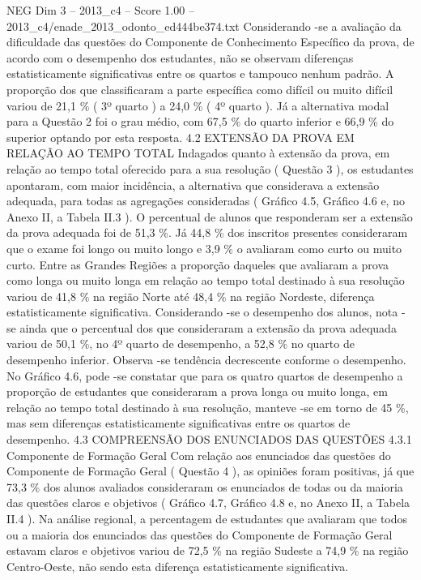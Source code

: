 \begin{textsample}{NEG Dim 3 – 2013\_c4 – Score 1.00 – 2013\_c4/enade\_2013\_odonto\_ed444be374.txt}
Considerando -se a avaliação da dificuldade das questões do Componente de Conhecimento Específico da prova, de acordo com o desempenho dos estudantes, não se observam diferenças estatisticamente significativas entre os quartos e tampouco nenhum padrão.
A proporção dos que classificaram a parte específica como difícil ou muito difícil variou de 21,1 \% ( 3º quarto ) a 24,0 \% ( 4º quarto ).
Já a alternativa modal para a Questão 2 foi o grau médio, com 67,5 \% do quarto inferior e 66,9 \% do superior optando por esta resposta. 4.2 EXTENSÃO DA PROVA EM RELAÇÃO AO TEMPO TOTAL Indagados quanto à extensão da prova, em relação ao tempo total oferecido para a sua resolução ( Questão 3 ), os estudantes apontaram, com maior incidência, a alternativa que considerava a extensão adequada, para todas as agregações consideradas ( Gráfico 4.5, Gráfico 4.6 e, no Anexo II, a Tabela II.3 ).
O percentual de alunos que responderam ser a extensão da prova adequada foi de 51,3 \%.
Já 44,8 \% dos inscritos presentes consideraram que o exame foi longo ou muito longo e 3,9 \% o avaliaram como curto ou muito curto.
Entre as Grandes Regiões a proporção daqueles que avaliaram a prova como longa ou muito longa em relação ao tempo total destinado à sua resolução variou de 41,8 \% na região Norte até 48,4 \% na região Nordeste, diferença estatisticamente significativa.
Considerando -se o desempenho dos alunos, nota -se ainda que o percentual dos que consideraram a extensão da prova adequada variou de 50,1 \%, no 4º quarto de desempenho, a 52,8 \% no quarto de desempenho inferior.
Observa -se tendência decrescente conforme o desempenho.
No Gráfico 4.6, pode -se constatar que para os quatro quartos de desempenho a proporção de estudantes que consideraram a prova longa ou muito longa, em relação ao tempo total destinado à sua resolução, manteve -se em torno de 45 \%, mas sem diferenças estatisticamente significativas entre os quartos de desempenho. 4.3 COMPREENSÃO DOS ENUNCIADOS DAS QUESTÕES 4.3.1 Componente de Formação Geral Com relação aos enunciados das questões do Componente de Formação Geral ( Questão 4 ), as opiniões foram positivas, já que 73,3 \% dos alunos avaliados consideraram os enunciados de todas ou da maioria das questões claros e objetivos ( Gráfico 4.7, Gráfico 4.8 e, no Anexo II, a Tabela II.4 ).
Na análise regional, a percentagem de estudantes que avaliaram que todos ou a maioria dos enunciados das questões do Componente de Formação Geral estavam claros e objetivos variou de 72,5 \% na região Sudeste a 74,9 \% na região Centro-Oeste, não sendo esta diferença estatisticamente significativa.

\end{textsample}
